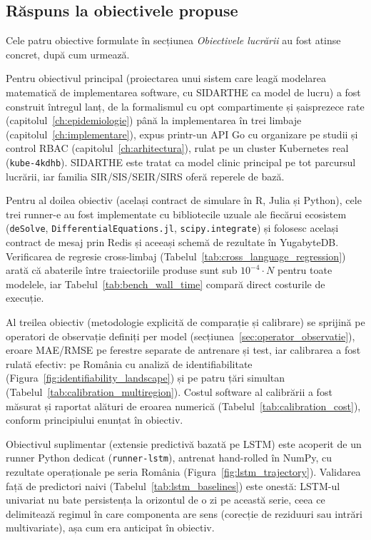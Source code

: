 {}
\subsection*{Răspuns la obiectivele propuse}
\label{subsec:atingere_obiective}

Cele patru obiective formulate în secțiunea \emph{Obiectivele lucrării} au fost atinse
concret, după cum urmează.

Pentru obiectivul principal (proiectarea unui sistem care leagă modelarea
matematică de implementarea software, cu SIDARTHE ca model de lucru) a
fost construit întregul lanț, de la formalismul cu opt compartimente și
șaisprezece rate (capitolul~\ref{ch:epidemiologie}) până la implementarea
în trei limbaje (capitolul~\ref{ch:implementare}), expus printr-un API Go
cu organizare pe studii și control RBAC (capitolul~\ref{ch:arhitectura}),
rulat pe un cluster Kubernetes real (\texttt{kube-4kdhb}). SIDARTHE este
tratat ca model clinic principal pe tot parcursul lucrării, iar familia
SIR/SIS/SEIR/SIRS oferă reperele de bază.

Pentru al doilea obiectiv (același contract de simulare în R, Julia și
Python), cele trei runner-e au fost implementate cu bibliotecile uzuale
ale fiecărui ecosistem (\texttt{deSolve}, \texttt{DifferentialEquations.jl},
\texttt{scipy.integrate}) și folosesc același contract de mesaj prin Redis
și aceeași schemă de rezultate în YugabyteDB. Verificarea de regresie
cross-limbaj (Tabelul~\ref{tab:cross_language_regression}) arată că
abaterile între traiectoriile produse sunt sub $10^{-4} \cdot N$ pentru
toate modelele, iar Tabelul~\ref{tab:bench_wall_time} compară direct
costurile de execuție.

Al treilea obiectiv (metodologie explicită de comparație și calibrare) se
sprijină pe operatori de observație definiți per model
(secțiunea~\ref{sec:operator_observatie}), eroare MAE/RMSE pe ferestre
separate de antrenare și test, iar calibrarea a fost rulată efectiv: pe
România cu analiză de identifiabilitate
(Figura~\ref{fig:identifiability_landscape}) și pe patru țări simultan
(Tabelul~\ref{tab:calibration_multiregion}). Costul software al
calibrării a fost măsurat și raportat alături de eroarea numerică
(Tabelul~\ref{tab:calibration_cost}), conform principiului enunțat în
obiectiv.

Obiectivul suplimentar (extensie predictivă bazată pe LSTM) este acoperit
de un runner Python dedicat (\texttt{runner-lstm}), antrenat hand-rolled
în NumPy, cu rezultate operaționale pe seria România
(Figura~\ref{fig:lstm_trajectory}). Validarea față de predictori naivi
(Tabelul~\ref{tab:lstm_baselines}) este onestă: LSTM-ul univariat nu bate
persistența la orizontul de o zi pe această serie, ceea ce delimitează
regimul în care componenta are sens (corecție de reziduuri sau intrări
multivariate), așa cum era anticipat în obiectiv.

